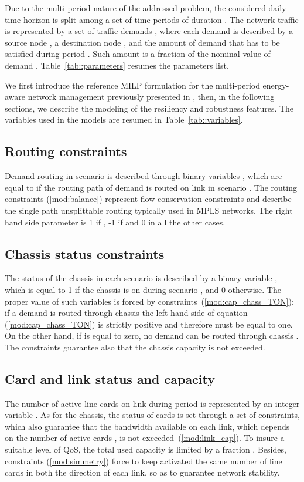 \documentclass[final,5p,times,twocolumn]{elsarticle}
\begin{document}
Due to the multi-period nature of the addressed problem, the considered daily time horizon is split among a set  of time periods  of duration . The network traffic is represented by a set of traffic demands , where each demand  is described by a source node , a destination node , and the amount of demand  that has to be satisfied during period . Such amount is a fraction of the nominal value of demand . 
Table~\ref{tab::parameters} resumes the parameters list.

We first introduce the reference MILP formulation for the multi-period energy-aware network management previously presented in \cite{addis13a}, then, in the following sections, we describe the modeling of the resiliency and robustness features. The variables used in the models are resumed in Table~\ref{tab::variables}.


\subsection{Routing constraints}
Demand   routing in scenario  is described through binary variables , which are equal to  if the routing path of demand  is routed on link  in scenario . The routing constraints (\ref{mod:balance}) represent flow conservation constraints and describe the single path unsplittable routing typically used in MPLS networks. The right hand side parameter  is 1 if , -1 if   and 0 in all the other cases.



\subsection{Chassis status constraints}
The status of the chassis in each scenario is described by a binary variable , which is equal to 1 if the chassis   is on during scenario , and 0 otherwise. The proper value of such variables is forced by constraints~(\ref{mod:cap_chass_TON}): if a demand is routed through chassis  the left hand side of equation (\ref{mod:cap_chass_TON}) is strictly positive and therefore  must be equal to one. On the other hand, if  is equal to zero, no demand can be routed through chassis . The constraints guarantee also that the chassis capacity  is not exceeded.



\subsection{Card and link status and capacity}
The number of active line cards on link  during period  is represented by an integer variable . As for the chassis, the status of cards is set through a set of constraints, which also guarantee  that the bandwidth available on each link, which depends on the number of active cards  , is not exceeded~(\ref{mod:link_cap}). To insure a suitable level of QoS, the total used capacity is limited by a fraction . Besides, constraints  (\ref{mod:simmetry}) force to keep activated the same number of line cards in both the direction of each link, so as to guarantee network stability. 
\end{document}
